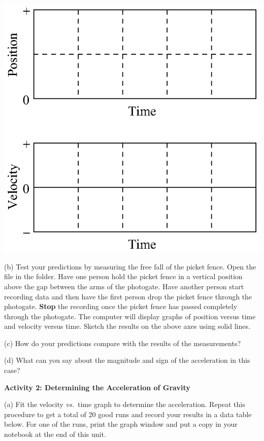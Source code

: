 \vspace{0.3cm}
{\par\centering \includegraphics{acceleration/acceleration_fig1.eps} \par}
\vspace{0.3cm}

(b) Test your predictions by measuring the free fall of the picket fence. Open
the file  in the \filename{\coursefolder} folder. 
Have one person hold the picket fence in a vertical
position above the gap between the arms of the photogate. Have another person
start recording data and then have the first person drop the picket fence through
the photogate. \textbf{Stop} the recording once the picket fence has passed
completely through the photogate. The computer will display graphs of position
versus time and velocity versus time. Sketch the results on the above axes using
solid lines.

(c) How do your predictions compare with the results of the measurements?
\vspace{20mm}

(d) What can you say about the magnitude and sign of the acceleration in this
case?
\vspace{20mm}

\textbf{Activity 2: Determining the Acceleration of Gravity }

(a) Fit the velocity \textit{vs.}~time graph to determine the acceleration. Repeat this
procedure to get a total of 20 good runs and record your results in a data table
below. For one of the runs, print the graph window and put a copy in your notebook
at the end of this unit.
\vspace{50mm}

